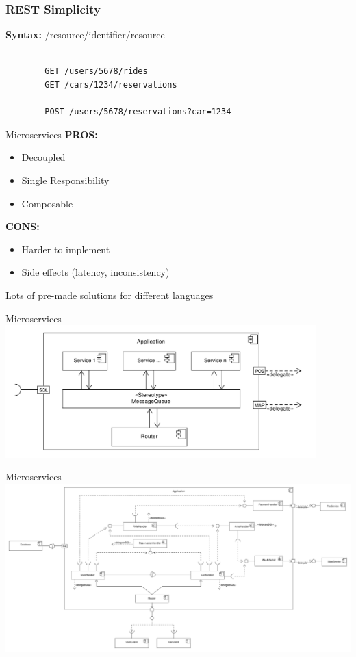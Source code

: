 \documentclass{beamer}
\begin{document}
\begin{frame}[fragile]
    \frametitle{REST Simplicity}
    \textbf{Syntax:} /resource/identifier/resource

    \begin{lstlisting}

        GET /users/5678/rides 
        GET /cars/1234/reservations 

        POST /users/5678/reservations?car=1234 
    \end{lstlisting}
\end{frame}

\begin{frame}{Microservices}
    \textbf{PROS:}
    \begin{itemize}
        \item Decoupled
        \item Single Responsibility
        \item Composable
    \end{itemize}
    \vspace{\baselineskip}
    \textbf{CONS:}
    \begin{itemize}
        \item Harder to implement
        \item Side effects (latency, inconsistency)
    \end{itemize}
    \vfill
    Lots of pre-made solutions for different languages
\end{frame}
\begin{frame}{Microservices}
    \includegraphics[width=0.9\textwidth]{internal_high_level_components}
\end{frame}

\begin{frame}{Microservices}
    \includegraphics[width=\textwidth]{low_level_components}
\end{frame}
\end{document}
